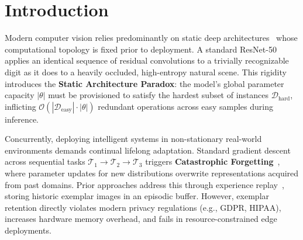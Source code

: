 \documentclass[11pt, a4paper]{article}
\begin{document}
\section{Introduction}
\label{sec:intro}

Modern computer vision relies predominantly on static deep architectures~\cite{he2016deep, vaswani2017attention} whose computational topology is fixed prior to deployment. A standard ResNet-50 applies an identical sequence of residual convolutions to a trivially recognizable digit as it does to a heavily occluded, high-entropy natural scene. This rigidity introduces the \textbf{Static Architecture Paradox}: the model's global parameter capacity $|\theta|$ must be provisioned to satisfy the hardest subset of instances $\mathcal{D}_{\text{hard}}$, inflicting $\mathcal{O}(|\mathcal{D}_{\text{easy}}| \cdot |\theta|)$ redundant operations across easy samples during inference.

Concurrently, deploying intelligent systems in non-stationary real-world environments demands continual lifelong adaptation. Standard gradient descent across sequential tasks $\mathcal{T}_1 \to \mathcal{T}_2 \to \mathcal{T}_3$ triggers \textbf{Catastrophic Forgetting}~\cite{mccloskey1989catastrophic, french1999catastrophic}, where parameter updates for new distributions overwrite representations acquired from past domains. Prior approaches address this through experience replay~\cite{rebuffi2017icarl, buzzega2020dark}, storing historic exemplar images in an episodic buffer. However, exemplar retention directly violates modern privacy regulations (e.g., GDPR, HIPAA), increases hardware memory overhead, and fails in resource-constrained edge deployments.
\end{document}
